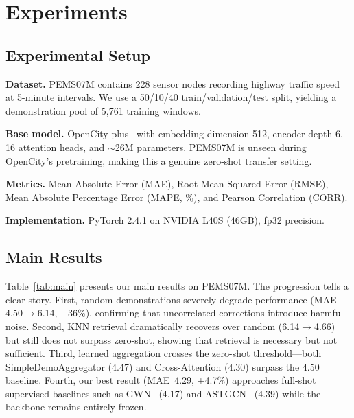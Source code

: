\documentclass[conference]{IEEEtran}
\begin{document}
\section{Experiments}

\subsection{Experimental Setup}

\textbf{Dataset.}
PEMS07M contains 228 sensor nodes recording highway traffic speed at 5-minute intervals.
We use a 50/10/40 train/validation/test split, yielding a demonstration pool of 5,761 training windows.

\textbf{Base model.}
OpenCity-plus~\cite{li2024opencity} with embedding dimension 512, encoder depth 6, 16 attention heads, and ${\sim}$26M parameters.
PEMS07M is unseen during OpenCity's pretraining, making this a genuine zero-shot transfer setting.

\textbf{Metrics.}
Mean Absolute Error (MAE), Root Mean Squared Error (RMSE), Mean Absolute Percentage Error (MAPE, \%), and Pearson Correlation (CORR).

\textbf{Implementation.}
PyTorch 2.4.1 on NVIDIA L40S (46GB), fp32 precision.

\subsection{Main Results}

Table~\ref{tab:main} presents our main results on PEMS07M.
The progression tells a clear story.
First, random demonstrations severely degrade performance (MAE 4.50$\to$6.14, $-$36\%), confirming that uncorrelated corrections introduce harmful noise.
Second, KNN retrieval dramatically recovers over random (6.14$\to$4.66) but still does not surpass zero-shot, showing that retrieval is necessary but not sufficient.
Third, learned aggregation crosses the zero-shot threshold---both SimpleDemoAggregator (4.47) and Cross-Attention (4.30) surpass the 4.50 baseline.
Fourth, our best result (MAE~4.29, +4.7\%) approaches full-shot supervised baselines such as GWN~\cite{wu2019graphwavenet} (4.17) and ASTGCN~\cite{guo2019astgcn} (4.39) while the backbone remains entirely frozen.
\end{document}
